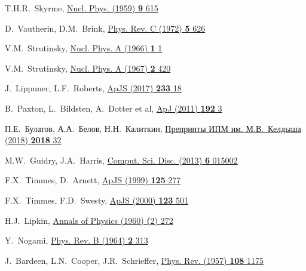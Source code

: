 \begin{thebibliography}{9}
T.H.R.~Skyrme,
\href{https://doi.org/10.1016/0029-5582(58)90345-6}
  {Nucl. Phys. (1959) \textbf{9} 615}
  
D.~Vautherin, D.M.~Brink,
\href{https://doi.org/10.1103/PhysRevC.5.626}
  {Phys. Rev. C (1972) \textbf{5} 626}

V.M.~Strutinsky,
\href{https://doi.org/10.1016/0375-9474(68)90699-4}
  {Nucl. Phys. A (1966) \textbf{1} 1}

V.M.~Strutinsky,
\href{https://doi.org/10.1016/0375-9474(67)90510-6}
  {Nucl. Phys. A (1967) \textbf{2} 420}

J.~Lippuner, L.F.~Roberts, 
\href{https://doi.org/10.3847/1538-4365/aa94cb}
  {ApJS (2017) \textbf{233} 18}

B.~Paxton, L.~Bildsten, A.~Dotter et al,
\href{https://doi.org/10.1088/0067-0049/192/1/3}
  {ApJ (2011) \textbf{192} 3}

П.Е.~Булатов, А.А.~Белов, Н.Н.~Калиткин,
\href{https://doi.org/10.20948/prepr-2018-173}
  {Препринты ИПМ им. М.В.~Келдыша (2018) \textbf{2018} 32}

M.W.~Guidry, J.A.~Harris,
\href{https://doi.org/10.1088/1749-4699/6/1/015003}
  {Comput. Sci. Disc. (2013) \textbf{6} 015002}

F.X.~Timmes, D.~Arnett,
\href{http://doi.org/10.1086/313271}{ApJS (1999) \textbf{125} 277}

F.X.~Timmes, F.D.~Swesty,
\href{http://doi.org/10.1086/313304}{ApJS (2000) \textbf{123} 501}

H.J.~Lipkin,
\href{https://doi.org/10.1016/0003-4916(60)90032-4}
  {Annals of Physics (1960) \textbf(2) 272}

Y.~Nogami,
\href{https://doi.org/10.1103/PhysRev.134.B313}
  {Phys. Rev. B (1964) \textbf{2} 313}

J.~Bardeen, L.N.~Cooper, J.R.~Schrieffer,
\href{https://doi.org/10.1103/PhysRev.108.1175}
  {Phys. Rev. (1957) \textbf{108} 1175}


\end{thebibliography}
